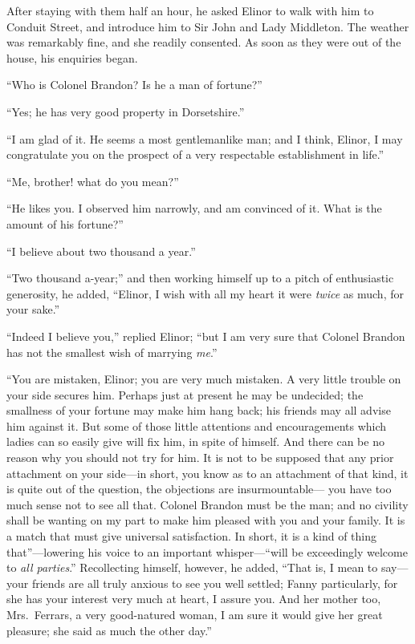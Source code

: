 \documentclass{article}
\begin{document}
After staying with them half an hour, he asked
Elinor to walk with him to Conduit Street, and introduce
him to Sir John and Lady Middleton.  The weather was
remarkably fine, and she readily consented.  As soon
as they were out of the house, his enquiries began.

``Who is Colonel Brandon?  Is he a man of fortune?''

``Yes; he has very good property in Dorsetshire.''

``I am glad of it.  He seems a most gentlemanlike man;
and I think, Elinor, I may congratulate you on the prospect
of a very respectable establishment in life.''

``Me, brother! what do you mean?''

``He likes you.  I observed him narrowly, and am
convinced of it.  What is the amount of his fortune?''

``I believe about two thousand a year.''

``Two thousand a-year;'' and then working himself
up to a pitch of enthusiastic generosity, he added,
``Elinor, I wish with all my heart it were \emph{twice} as much,
for your sake.''

``Indeed I believe you,'' replied Elinor; ``but I am
very sure that Colonel Brandon has not the smallest wish
of marrying \emph{me}.''

``You are mistaken, Elinor; you are very much mistaken.
A very little trouble on your side secures him.
Perhaps just at present he may be undecided; the smallness
of your fortune may make him hang back; his friends
may all advise him against it.  But some of those little
attentions and encouragements which ladies can so easily
give will fix him, in spite of himself.  And there can be
no reason why you should not try for him.  It is not to be
supposed that any prior attachment on your side---in short,
you know as to an attachment of that kind, it is quite
out of the question, the objections are insurmountable---%
you have too much sense not to see all that.  Colonel Brandon
must be the man; and no civility shall be wanting on
my part to make him pleased with you and your family.
It is a match that must give universal satisfaction.
In short, it is a kind of thing that''---lowering his voice
to an important whisper---``will be exceedingly welcome
to \emph{all parties}.'' Recollecting himself, however, he added,
``That is, I mean to say---your friends are all truly
anxious to see you well settled; Fanny particularly,
for she has your interest very much at heart, I assure you.
And her mother too, Mrs.\ Ferrars, a very good-natured woman,
I am sure it would give her great pleasure; she said as much
the other day.''
\end{document}
